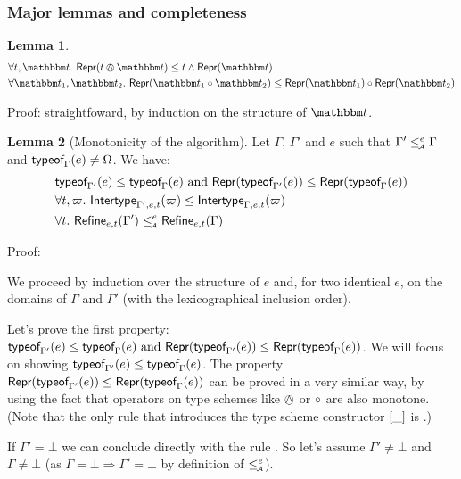 \documentclass[a4paper]{article}
\theoremstyle{definition}
\newtheorem{lemma}{Lemma}
\begin{document}
  \subsubsection{Major lemmas and completeness}

  \begin{lemma}
    \begin{align*}
      &\forall t,\ts.\ \tsrep{t\tsand\ts} \leq t \land \tsrep{\ts}\\
      &\forall \ts_1,\ts_2.\ \tsrep{\apply {\ts_1}{\ts_2}} \leq \apply {\tsrep {\ts_1}}{\tsrep {\ts_2}}
    \end{align*}
  \end{lemma}

  Proof: straightfoward, by induction on the structure of $\ts$.

  \begin{lemma}[Monotonicity of the algorithm] Let $\Gamma$, $\Gamma'$ and $e$ such that $\Gamma'\leq_{\!\scriptscriptstyle\mathcal{A}}^e \Gamma$ and $\textsf{typeof}_{\Gamma}(e) \neq \Omega$. We have:
    \begin{align*}
      &\textsf{typeof}_{\Gamma'}(e) \leq \textsf{typeof}_{\Gamma}(e) \text{ and } \textsf{Repr}(\textsf{typeof}_{\Gamma'}(e)) \leq \textsf{Repr}(\textsf{typeof}_{\Gamma}(e))\\
      &\forall t,\varpi.\ \textsf{Intertype}_{\Gamma',e,t} (\varpi) \leq \textsf{Intertype}_{\Gamma,e,t} (\varpi)\\
      &\forall t.\ \textsf{Refine}_{e,t}(\Gamma') \leq_{\!\scriptscriptstyle\mathcal{A}}^e \textsf{Refine}_{e,t}(\Gamma)\\
    \end{align*}
  \end{lemma}

  Proof:

  We proceed by induction over the structure of $e$
  and, for two identical $e$, on the domains of $\Gamma$ and $\Gamma'$ (with the lexicographical inclusion order).

  Let's prove the first property: $\textsf{typeof}_{\Gamma'}(e) \leq \textsf{typeof}_{\Gamma}(e) \text{ and } \textsf{Repr}(\textsf{typeof}_{\Gamma'}(e)) \leq \textsf{Repr}(\textsf{typeof}_{\Gamma}(e))$.
  We will focus on showing $\textsf{typeof}_{\Gamma'}(e) \leq \textsf{typeof}_{\Gamma}(e)$. The property $\textsf{Repr}(\textsf{typeof}_{\Gamma'}(e)) \leq \textsf{Repr}(\textsf{typeof}_{\Gamma}(e))$
  can be proved in a very similar way, by using the fact that operators on type schemes like $\tsand$ or $\circ$ are also monotone.
  (Note that the only rule that introduces the type scheme constructor ${[}\_]$ is .)

  If $\Gamma' = \bot$ we can conclude directly with the rule .
  So let's assume $\Gamma' \neq \bot$ and $\Gamma \neq \bot$
  (as $\Gamma = \bot \Rightarrow \Gamma' = \bot$ by definition of $\leq_{\!\scriptscriptstyle\mathcal{A}}^e$).
\end{document}
